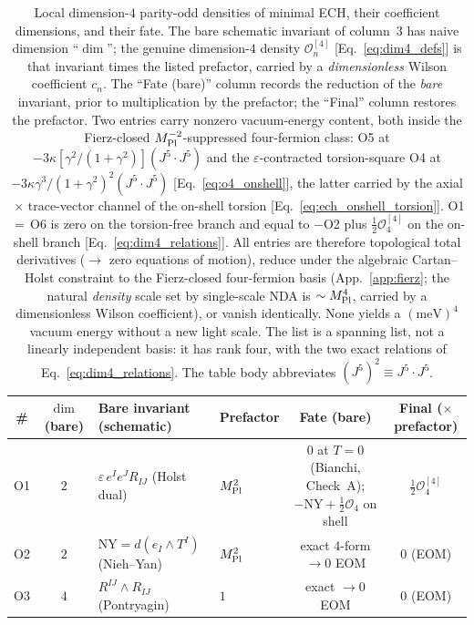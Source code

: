 \documentclass[aps,prd,twocolumn,superscriptaddress,showpacs,preprintnumbers,nofootinbib,longbibliography,floatfix]{revtex4-2}
\newcommand{\MPl}{M_{\rm Pl}}
\begin{document}
\begin{table}[t]
\caption{Local dimension-$4$ parity-odd densities of minimal ECH, their
coefficient dimensions, and their fate. The bare schematic invariant of
column~3 has naive dimension ``$\dim$''; the genuine dimension-$4$ density
$\mathcal{O}_n^{[4]}$ [Eq.~\eqref{eq:dim4_defs}] is that invariant times the
listed prefactor, carried by a \emph{dimensionless} Wilson coefficient $c_n$.
The ``Fate (bare)'' column records the reduction of the \emph{bare}
invariant, prior to multiplication by the prefactor; the ``Final''
column restores the prefactor. Two entries carry nonzero
vacuum-energy content, both inside the Fierz-closed
$\MPl^{-2}$-suppressed four-fermion class: O5 at
$-3\kappa[\gamma^2/(1+\gamma^2)](J^5\!\cdot\!J^5)$ and the
$\varepsilon$-contracted torsion-square O4 at
$-3\kappa\gamma^3/(1+\gamma^2)^2(J^5\!\cdot\!J^5)$
[Eq.~\eqref{eq:o4_onshell}], the latter carried by the
axial$\,\times\,$trace-vector channel of the on-shell torsion
[Eq.~\eqref{eq:ech_onshell_torsion}]. O1$\,=\,$O6 is zero on the
torsion-free branch and equal to $-$O2 plus
$\tfrac12\mathcal{O}_4^{[4]}$ on the on-shell branch
[Eq.~\eqref{eq:dim4_relations}].
All entries are therefore topological total derivatives ($\to$ zero equations of
motion), reduce under the algebraic Cartan--Holst constraint to the
Fierz-closed
four-fermion basis (App.~\ref{app:fierz}; the natural \emph{density} scale
set by single-scale NDA is $\sim\MPl^4$, carried by a dimensionless
Wilson coefficient), or vanish identically.
None yields a $(\text{meV})^4$ vacuum energy without a new light scale.
The list is a spanning list, not a linearly independent basis: it has
rank four, with the two exact relations of
Eq.~\eqref{eq:dim4_relations}. The table body abbreviates
$(J^5)^2\equiv J^5\!\cdot\!J^5$.}
\label{tab:dim4_parityodd}
\begin{ruledtabular}
\footnotesize
\begin{tabular}{ccllcc}
\# & $\dim$ (bare) & Bare invariant (schematic) & Prefactor & Fate (bare) & Final ($\times$prefactor) \\
\hline
O1 & $2$ & $\varepsilon\,e^I e^J R_{IJ}$ (Holst dual) & $\MPl^{2}$ & $0$ at $T{=}0$ (Bianchi, Check~A); $-\mathrm{NY}+\tfrac12\mathcal{O}_4$ on shell & $\tfrac12\mathcal{O}_4^{[4]}$ \\
O2 & $2$ & $\mathrm{NY}=d(e_I\wedge T^I)$ (Nieh--Yan) & $\MPl^{2}$ & exact 4-form $\to0$ EOM & $0$ (EOM) \\
O3 & $4$ & $R^{IJ}\wedge R_{IJ}$ (Pontryagin) & $1$ & exact $\to0$ EOM & $0$ (EOM) \\

\end{tabular}
\end{ruledtabular}
\end{table}
\end{document}
